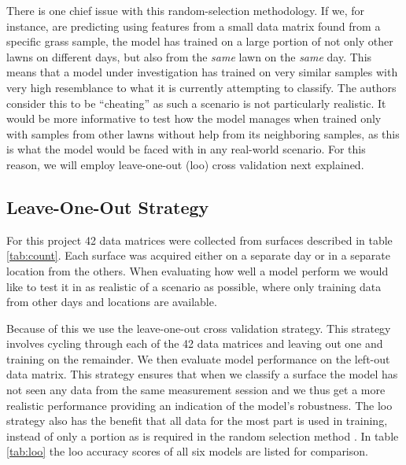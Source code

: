 There is one chief issue with this random-selection methodology. If we, for instance, are predicting using features from a small data matrix found from a specific grass sample, the model has trained on a large portion of not only other lawns on different days, but also from the \emph{same} lawn on the \emph{same} day. This means that a model under investigation has trained on very similar samples with very high resemblance to what it is currently attempting to classify. The authors consider this to be ``cheating'' as such a scenario is not particularly realistic. It would be more informative to test how the model manages when trained only with samples from other lawns without help from its neighboring samples, as this is what the model would be faced with in any real-world scenario. For this reason, we will employ leave-one-out (\gls{loo}) cross validation next explained. 





\subsection{Leave-One-Out Strategy}


For this project 42 data matrices were collected from surfaces described in table \ref{tab:count}. Each surface was acquired either on a separate day or in a separate location from the others. When evaluating how well a model perform we would like to test it in as realistic of a scenario as possible, where only training data from other days and locations are available. 

Because of this we use the leave-one-out cross validation strategy. This strategy involves cycling through each of the 42 data matrices and leaving out one and training on the remainder. We then evaluate model performance on the left-out data matrix. This strategy ensures that when we classify a surface the model has not seen any data from the same measurement session and we thus get a more realistic performance providing an indication of the model's robustness. The \gls{loo} strategy also has the benefit that all data for the most part is used in training, instead of only a portion as is required in the random selection method \citep{raschka}. In table \ref{tab:loo} the \gls{loo} accuracy scores of all six models are listed for comparison. 

